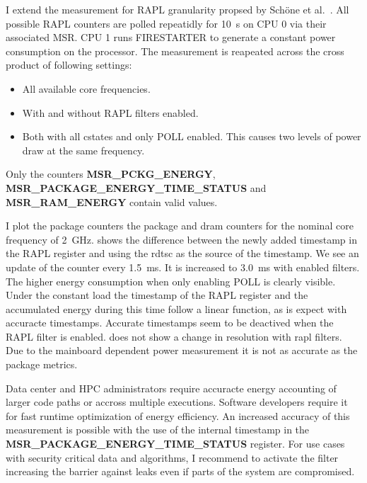 I extend the measurement for RAPL granularity propsed by Schöne et al.~\cite{Schoene_2024_Alder_Lake}.
All possible RAPL counters are polled repeatidly for \SI{10}{\s} on CPU 0 via their associated MSR.
CPU 1 runs FIRESTARTER to generate a constant power consumption on the processor.
The measurement is reapeated across the cross product of following settings:
\begin{itemize}
    \item All available core frequencies.
    \item With and without RAPL filters enabled.
    \item Both with all cstates and only POLL enabled.
    This causes two levels of power draw at the same frequency.
\end{itemize}
Only the counters \textbf{MSR\_PCKG\_ENERGY}, \textbf{MSR\_PACKAGE\_ENERGY\_TIME\_STATUS} and\\ \textbf{MSR\_RAM\_ENERGY} contain valid values.

I plot the package counters the package and dram counters for the nominal core frequency of \SI{2}{\GHz}.
 shows the difference between the newly added timestamp in the RAPL register and using the rdtsc as the source of the timestamp.
We see an update of the counter every \SI{1.5}{\ms}.
It is increased to \SI{3.0}{\ms} with enabled filters.
The higher energy consumption when only enabling POLL is clearly visible.
Under the constant load the timestamp of the RAPL register and the accumulated energy during this time follow a linear function, as is expect with accuracte timestamps.
Accurate timestamps seem to be deactived when the RAPL filter is enabled.
 does not show a change in resolution with rapl filters.
Due to the mainboard dependent power measurement it is not as accurate as the package metrics.

Data center and HPC administrators require accuracte energy accounting of larger code paths or accross multiple executions.
Software developers require it for fast runtime optimization of energy efficiency.
An increased accuracy of this measurement is possible with the use of the internal timestamp in the \textbf{MSR\_PACKAGE\_ENERGY\_TIME\_STATUS} register.
For use cases with security critical data and algorithms, I recommend to activate the filter increasing the barrier against leaks even if parts of the system are compromised.

